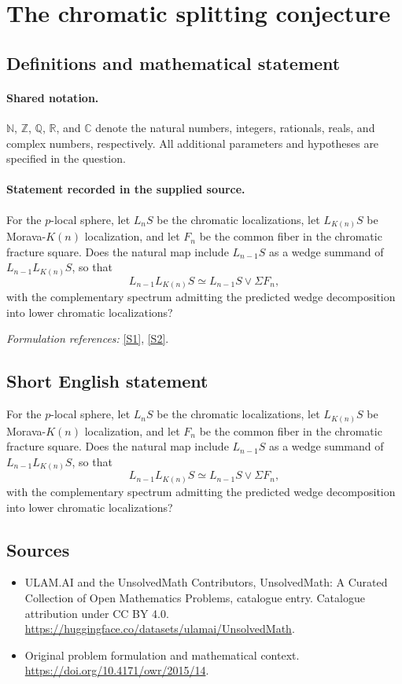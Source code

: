 \documentclass[11pt]{article}
\newcommand{\sref}[2]{\hyperlink{source:#1:#2}{[S#2]}}
\begin{document}
\section{The chromatic splitting conjecture}\label{statement}

\subsection{Definitions and mathematical statement}

\paragraph{Shared notation.}$\mathbb N$, $\mathbb Z$, $\mathbb Q$, $\mathbb R$, and $\mathbb C$ denote the natural numbers, integers, rationals, reals, and complex numbers, respectively. All additional parameters and hypotheses are specified in the question.


\paragraph{Statement recorded in the supplied source.}
For the $p$-local sphere, let $L_nS$ be the chromatic localizations, let $L_{K(n)}S$ be Morava-$K(n)$ localization, and let $F_n$ be the common fiber in the chromatic fracture square. Does the natural map include $L_{n-1}S$ as a wedge summand of $L_{n-1}L_{K(n)}S$, so that
\[L_{n-1}L_{K(n)}S\simeq L_{n-1}S\vee\Sigma F_n,\]
with the complementary spectrum admitting the predicted wedge decomposition into lower chromatic localizations?
\par\smallskip\textit{Formulation references:} \sref{statement}{1}, \sref{statement}{2}.
\subsection{Short English statement}
For the $p$-local sphere, let $L_nS$ be the chromatic localizations, let $L_{K(n)}S$ be Morava-$K(n)$ localization, and let $F_n$ be the common fiber in the chromatic fracture square. Does the natural map include $L_{n-1}S$ as a wedge summand of $L_{n-1}L_{K(n)}S$, so that
\[L_{n-1}L_{K(n)}S\simeq L_{n-1}S\vee\Sigma F_n,\]
with the complementary spectrum admitting the predicted wedge decomposition into lower chromatic localizations?
\subsection{Sources}
\begin{itemize}
\item[\hypertarget{source:statement:1}{S1}] ULAM.AI and the UnsolvedMath Contributors, UnsolvedMath: A Curated Collection of Open Mathematics Problems, catalogue entry. Catalogue attribution under CC BY 4.0.
\url{https://huggingface.co/datasets/ulamai/UnsolvedMath}.
\item[\hypertarget{source:statement:2}{S2}] Original problem formulation and mathematical context.
\url{https://doi.org/10.4171/owr/2015/14}.
\end{itemize}
\label{end:statement}
\end{document}
